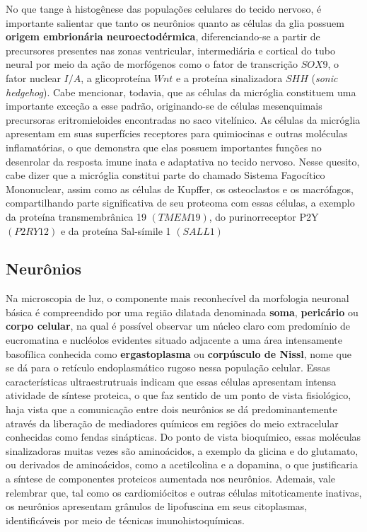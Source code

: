 \documentclass[
]{book}
\begin{document}
No que tange à histogênese das populações celulares do tecido nervoso, é importante salientar que tanto os neurônios quanto as células da glia possuem \textbf{origem embrionária neuroectodérmica}, diferenciando-se a partir de precursores presentes nas zonas ventricular, intermediária e cortical do tubo neural por meio da ação de morfógenos como o fator de transcrição \(SOX9\), o fator nuclear \(I/A\), a glicoproteína \(Wnt\) e a proteína sinalizadora \(SHH\) (\emph{sonic hedgehog}). Cabe mencionar, todavia, que as células da micróglia constituem uma importante exceção a esse padrão, originando-se de células mesenquimais precursoras eritromieloides encontradas no saco vitelínico. As células da micróglia apresentam em suas superfícies receptores para quimiocinas e outras moléculas inflamatórias, o que demonstra que elas possuem importantes funções no desenrolar da resposta imune inata e adaptativa no tecido nervoso. Nesse quesito, cabe dizer que a micróglia constitui parte do chamado Sistema Fagocítico Mononuclear, assim como as células de Kupffer, os osteoclastos e os macrófagos, compartilhando parte significativa de seu proteoma com essas células, a exemplo da proteína transmembrânica 19 \((TMEM19)\), do purinorreceptor P2Y \((P2RY12)\) e da proteína Sal-símile 1 \((SALL1)\)

\hypertarget{neuruxf4nios}{%
\subsection*{Neurônios}\label{neuruxf4nios}}

Na microscopia de luz, o componente mais reconhecível da morfologia neuronal básica é compreendido por uma região dilatada denominada \textbf{soma}, \textbf{pericário} ou \textbf{corpo celular}, na qual é possível observar um núcleo claro com predomínio de eucromatina e nucléolos evidentes situado adjacente a uma área intensamente basofílica conhecida como \textbf{ergastoplasma} ou \textbf{corpúsculo de Nissl}, nome que se dá para o retículo endoplasmático rugoso nessa população celular. Essas características ultraestrutruais indicam que essas células apresentam intensa atividade de síntese proteica, o que faz sentido de um ponto de vista fisiológico, haja vista que a comunicação entre dois neurônios se dá predominantemente através da liberação de mediadores químicos em regiões do meio extracelular conhecidas como fendas sinápticas. Do ponto de vista bioquímico, essas moléculas sinalizadoras muitas vezes são aminoácidos, a exemplo da glicina e do glutamato, ou derivados de aminoácidos, como a acetilcolina e a dopamina, o que justificaria a síntese de componentes proteicos aumentada nos neurônios. Ademais, vale relembrar que, tal como os cardiomiócitos e outras células mitoticamente inativas, os neurônios apresentam grânulos de lipofuscina em seus citoplasmas, identificáveis por meio de técnicas imunohistoquímicas.
\end{document}

